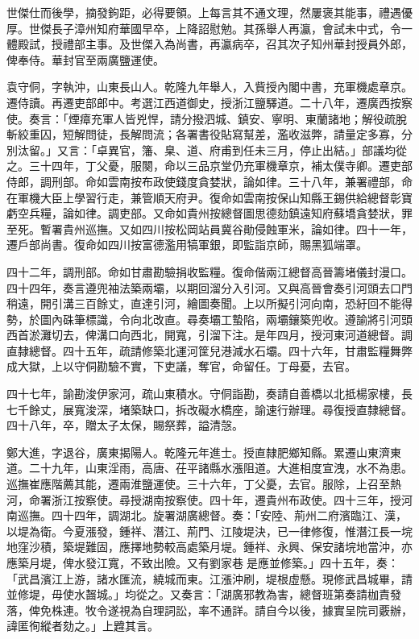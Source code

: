 \begin{pinyinscope}
世傑仕而後學，摘發鉤距，必得要領。上每言其不通文理，然屢褒其能事，禮遇優厚。世傑長子漳州知府華國早卒，上降詔慰勉。其孫舉人再瀛，會試未中式，令一體殿試，授禮部主事。及世傑入為尚書，再瀛病卒，召其次子知州華封授員外郎，俾奉侍。華封官至兩廣鹽運使。

袁守侗，字執沖，山東長山人。乾隆九年舉人，入貲授內閣中書，充軍機處章京。遷侍讀。再遷吏部郎中。考選江西道御史，授浙江鹽驛道。二十八年，遷廣西按察使。奏言：「煙瘴充軍人皆兇悍，請分撥泗城、鎮安、寧明、東蘭諸地；解役疏脫斬絞重囚，短解問徒，長解問流；各署書役貼寫幫差，濫收滋弊，請量定多寡，分別汰留。」又言：「卓異官，籓、臬、道、府甫到任未三月，停止出結。」部議均從之。三十四年，丁父憂，服闋，命以三品京堂仍充軍機章京，補太僕寺卿。遷吏部侍郎，調刑部。命如雲南按布政使錢度貪婪狀，論如律。三十八年，兼署禮部，命在軍機大臣上學習行走，兼管順天府尹。復命如雲南按保山知縣王錫供給總督彰寶虧空兵糧，論如律。調吏部。又命如貴州按總督圖思德劾鎮遠知府蘇墧貪婪狀，罪至死。暫署貴州巡撫。又如四川按松岡站員冀谷勛侵蝕軍米，論如律。四十一年，遷戶部尚書。復命如四川按富德濫用犒軍銀，即監詣京師，賜黑狐端罩。

四十二年，調刑部。命如甘肅勘驗捐收監糧。復命偕兩江總督高晉籌堵儀封漫口。四十四年，奏言遵兜袖法築兩壩，以期回溜分入引河。又與高晉會奏引河頭去口門稍遠，開引溝三百餘丈，直達引河，繪圖奏聞。上以所擬引河向南，恐紆回不能得勢，於圖內硃筆標識，令向北改直。尋奏壩工蟄陷，兩壩鑲築兜收。遵諭將引河頭西首淤灘切去，俾溝口向西北，開寬，引溜下注。是年四月，授河東河道總督。調直隸總督。四十五年，疏請修築北運河筐兒港減水石壩。四十六年，甘肅監糧舞弊成大獄，上以守侗勘驗不實，下吏議，奪官，命留任。丁母憂，去官。

四十七年，諭勘浚伊家河，疏山東積水。守侗詣勘，奏請自善橋以北抵楊家樓，長七千餘丈，展寬浚深，堵築缺口，拆改礙水橋座，諭速行辦理。尋復授直隸總督。四十八年，卒，贈太子太保，賜祭葬，謚清愨。

鄭大進，字退谷，廣東揭陽人。乾隆元年進士。授直隸肥鄉知縣。累遷山東濟東道。二十九年，山東淫雨，高唐、茌平諸縣水漲阻道。大進相度宣洩，水不為患。巡撫崔應階薦其能，遷兩淮鹽運使。三十六年，丁父憂，去官。服除，上召至熱河，命署浙江按察使。尋授湖南按察使。四十年，遷貴州布政使。四十三年，授河南巡撫。四十四年，調湖北。旋署湖廣總督。奏：「安陸、荊州二府濱臨江、漢，以堤為衛。今夏漲發，鍾祥、潛江、荊門、江陵堤決，已一律修復，惟潛江長一垸地窪沙積，築堤難固，應擇地勢較高處築月堤。鍾祥、永興、保安諸垸地當沖，亦應築月堤，俾水發江寬，不致出險。又有劉家巷是應並修築。」四十五年，奏：「武昌濱江上游，諸水匯流，繞城而東。江漲沖刷，堤根虛懸。現修武昌城畢，請並修堤，毋使水齧城。」均從之。又奏言：「湖廣邪教為害，總督班第奏請枷責發落，俾免株連。牧令遂視為自理詞訟，率不通詳。請自今以後，據實呈院司覈辦，諱匿徇縱者劾之。」上韙其言。


\end{pinyinscope}
